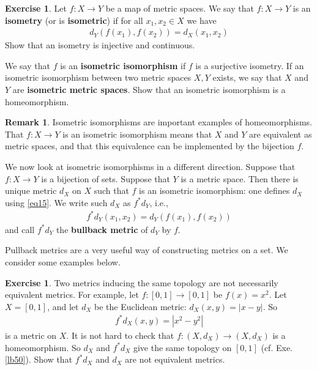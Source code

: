 \documentclass[12pt,b5paper,notitlepage]{article}
\theoremstyle{definition}
\newtheorem{exe}[df]{Exercise}
\newtheorem{rem}[df]{Remark}
\theoremstyle{plain}
\numberwithin{equation}{section}
\begin{document}
\begin{exe}\label{lb46}
Let $f:X\rightarrow Y$ be a map of metric spaces. We say that $f:X\rightarrow Y$ is an \textbf{isometry} (or is \textbf{isometric})  if for all $x_1,x_2\in X$ we have
\begin{align}
d_Y(f(x_1),f(x_2))=d_X(x_1,x_2) \label{eq15}
\end{align}
Show that an isometry is injective and continuous.

We say that $f$ is an \textbf{isometric isomorphism} if $f$ is a surjective isometry. If an isometric isomorphism between two metric spaces $X,Y$ exists, we say that $X$ and $Y$ are \textbf{isometric metric spaces}. Show that an isometric isomorphism is a homeomorphism.   \hfill\qedsymbol
\end{exe}

\begin{rem}
Isometric isomorphisms are important examples of homeomorphisms. That $f:X\rightarrow Y$ is an isometric isomorphism means that $X$ and $Y$ are equivalent as metric spaces, and that this equivalence can be implemented by the bijection $f$. 

We now look at isometric isomorphisms in a different direction. Suppose that $f:X\rightarrow Y$ is a bijection of sets. Suppose that $Y$ is a metric space. Then there is unique metric $d_X$ on $X$ such that $f$ is an isometric isomorphism: one defines $d_X$ using \eqref{eq15}. We write such $d_X$ as $f^*d_Y$,   i.e.,
\begin{align*}
f^*d_Y(x_1,x_2)=d_Y(f(x_1),f(x_2))
\end{align*}
and call $f^*d_Y$ the \textbf{bullback metric}  of $d_Y$ by $f$. \hfill\qedsymbol
\end{rem}

Pullback metrics are a very useful way of constructing metrics on a set. We consider some examples below. 


\begin{exe}\label{lb49}
Two metrics inducing the same topology are not necessarily equivalent metrics. For example, let $f:[0,1]\rightarrow [0,1]$ be $f(x)=x^2$. Let $X=[0,1]$, and let $d_X$ be the  Euclidean metric: $d_X(x,y)=|x-y|$. So
\begin{align*}
f^*d_X(x,y)=|x^2-y^2|
\end{align*}
is a metric on $X$. It is not hard to check that $f:(X,d_X)\rightarrow (X,d_X)$ is a homeomorphism.  So $d_X$ and $f^*d_X$ give the same topology on $[0,1]$ (cf. Exe. \ref{lb50}). Show that $f^*d_X$ and $d_X$ are not equivalent metrics.
\end{exe}
\end{document}
